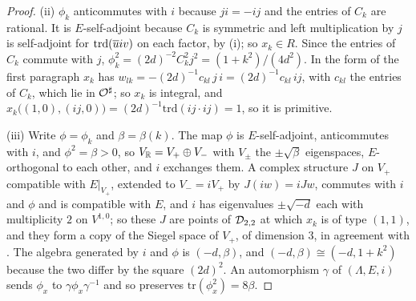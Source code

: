 \begin{proof}
(ii) $\phi_{k}$ anticommutes with $i$ because $ji=-ij$ and the entries of
$C_{k}$ are rational. It is $E$-self-adjoint because $C_{k}$ is symmetric and
left multiplication by $j$ is self-adjoint for $\mathrm{trd}(\overline{u}iv)$ on
each factor, by (i); so $x_{k}\in R$. Since the entries of
$C_{k}$ commute with $j$, $\phi_{k}^{2}=(2d)^{-2}C_{k}^{2}j^{2}=(1+k^{2})/(4d^{2})$.
In the form of the first paragraph $x_{k}$ has
$w_{lk}=-(2d)^{-1}c_{kl}\,j\,i=(2d)^{-1}c_{kl}\,ij$, with $c_{kl}$ the entries of
$C_{k}$, which lie in $\mathcal{O}^{\sharp}$; so $x_{k}$ is integral, and
$x_{k}\bigl((1,0),(ij,0)\bigr)=(2d)^{-1}\mathrm{trd}(ij\cdot ij)=1$, so it is
primitive.

(iii) Write $\phi=\phi_{k}$ and $\beta=\beta(k)$. The map $\phi$ is
$E$-self-adjoint, anticommutes with $i$, and $\phi^{2}=\beta>0$, so
$V_{\mathbb{R}}=V_{+}\oplus V_{-}$ with $V_{\pm}$ the $\pm\sqrt{\beta}$ eigenspaces,
$E$-orthogonal to each other, and $i$ exchanges them. A complex structure $J$
on $V_{+}$ compatible with $E|_{V_{+}}$, extended to $V_{-}=iV_{+}$ by
$J(iw)=iJw$, commutes with $i$ and $\phi$ and is compatible with $E$, and $i$
has eigenvalues $\pm\sqrt{-d}$ each with multiplicity $2$ on $V^{1,0}$; so
these $J$ are points of $\mathcal{D}_{2,2}$ at which $x_{k}$ is of type $(1,1)$, and
they form a copy of the Siegel space of $V_{+}$, of dimension $3$, in
agreement with . The algebra generated by $i$ and $\phi$
is $(-d,\beta)$, and $(-d,\beta)\cong(-d,1+k^{2})$ because the two differ by
the square $(2d)^{2}$. An automorphism $\gamma$ of $(\Lambda,E,i)$ sends
$\phi_{x}$ to $\gamma\phi_{x}\gamma^{-1}$ and so preserves
$\mathrm{tr}(\phi_{x}^{2})=8\beta$.


\end{proof}
